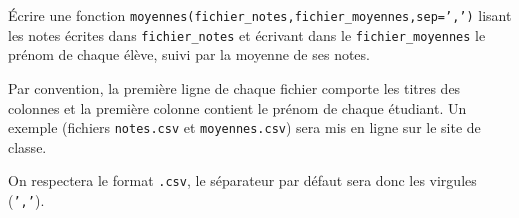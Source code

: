 Écrire une fonction \texttt{moyennes(fichier\_notes,fichier\_moyennes,sep=',')} lisant les notes écrites dans \texttt{fichier\_notes} et écrivant dans le \texttt{fichier\_moyennes} le prénom de chaque élève, suivi par la moyenne de ses notes. 

Par convention, la première ligne de chaque fichier comporte les titres des colonnes et la première colonne contient le prénom de chaque étudiant. Un exemple (fichiers \texttt{notes.csv} et \texttt{moyennes.csv}) sera mis en ligne sur le site de classe. 

On respectera le format  \texttt{.csv}, le séparateur par défaut sera donc les virgules (\texttt{','}). 